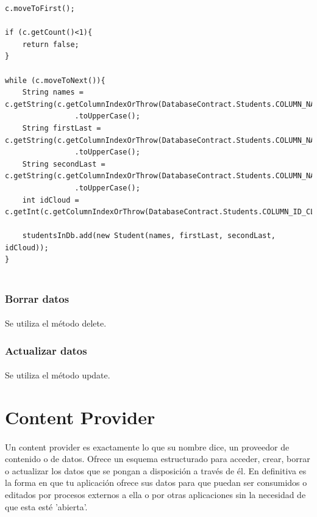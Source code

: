\documentclass[10pt]{extarticle}
\begin{document}
\begin{lstlisting}
c.moveToFirst();

if (c.getCount()<1){
    return false;
}

while (c.moveToNext()){
    String names = c.getString(c.getColumnIndexOrThrow(DatabaseContract.Students.COLUMN_NAME_STUDENT_NAMES))
    		    .toUpperCase();
    String firstLast = c.getString(c.getColumnIndexOrThrow(DatabaseContract.Students.COLUMN_NAME_FIRST_LASTNAME))
    		    .toUpperCase();
    String secondLast = c.getString(c.getColumnIndexOrThrow(DatabaseContract.Students.COLUMN_NAME_SECOND_LASTNAME))
    			.toUpperCase();
    int idCloud = c.getInt(c.getColumnIndexOrThrow(DatabaseContract.Students.COLUMN_ID_CLOUD));
    
    studentsInDb.add(new Student(names, firstLast, secondLast, idCloud));
}
     
\end{lstlisting}

\subsubsection{Borrar datos}
\paragraph{}
Se utiliza el método delete.

\subsubsection{Actualizar datos}
\paragraph{}
Se utiliza el método update.


\section{Content Provider}

\paragraph{}
Un content provider es exactamente lo que su nombre dice, un proveedor de contenido o de datos. Ofrece un esquema estructurado para acceder, crear, borrar o actualizar los datos que se pongan a disposición a través de él. En definitiva es la forma en que tu aplicación ofrece sus datos para que puedan ser consumidos o editados por procesos externos a ella o por otras aplicaciones sin la necesidad de que esta esté 'abierta'.
\end{document}
